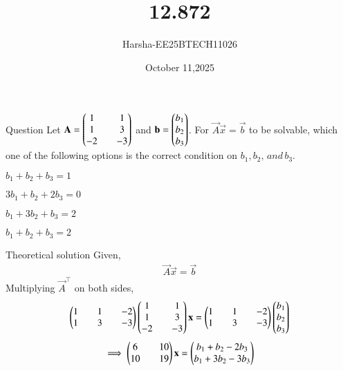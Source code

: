 \documentclass{beamer}
\title %
{12.872}
\date{October 11,2025}
\author %
{Harsha-EE25BTECH11026}
\begin{document}
\frame{\titlepage}


\begin{frame}{Question}
Let $\mathbf{A}=\begin{pmatrix}1&&1\\1&&3\\-2&&-3\end{pmatrix}$ and $\mathbf{b}=\begin{pmatrix}b_1\\b_2\\b_3\end{pmatrix}$. For $\vec{A}\vec{x}=\vec{b}$ to be solvable, which one of the following options is the correct condition on $b_1,b_2,\,and\,b_3$.
\begin{enumerate}
\begin{multicols}{2}
    \item $b_1+b_2+b_3=1$
    \item $3b_1+b_2+2b_3=0$
    \item $b_1+3b_2+b_3=2$
    \item $b_1+b_2+b_3=2$
\end{multicols}
\end{enumerate}
\end{frame}


\begin{frame}{Theoretical solution}
Given,
\begin{align}
    \vec{A}\vec{x}=\vec{b} \label{eq:1}
\end{align}
Multiplying $\vec{A}^{\top}$ on both sides,
\begin{align}
    \begin{pmatrix}1&&1&&-2\\1&&3&&-3\end{pmatrix}\begin{pmatrix}1&&1\\1&&3\\-2&&-3\end{pmatrix}\mathbf{x}=\begin{pmatrix}1&&1&&-2\\1&&3&&-3\end{pmatrix}\begin{pmatrix}b_1\\b_2\\b_3\end{pmatrix}
\end{align}
\begin{align}
    \implies \begin{pmatrix}6&&10\\10&&19\end{pmatrix}\mathbf{x}=\begin{pmatrix}b_1+b_2-2b_3\\b_1+3b_2-3b_3\end{pmatrix}
\end{align}
\end{frame}
\end{document}
